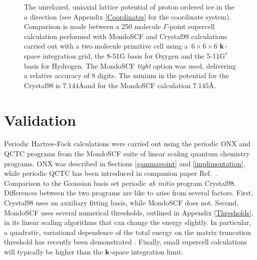 \documentclass[prb,aps,nobibnotes,twocolumn,doublespace,twocolumngrid,superbib]{revtex4}
\begin{document}
\begin{figure}[p]
\caption{The unrelaxed, uniaxial lattice potential of proton ordered ice \cite{}
in the $a$ direction (see Appendix \ref{Coordinates} for the coordinate system).  
Comparison is made between a 250 molecule $\Gamma$-point supercell calculation performed 
with {\sc MondoSCF} and {\sc Crystal98} calculations carried out with a two molecule primitive
cell using a~$6\times6\times6$ $\bf k$-space integration grid, the 8-51G basis for Oxygen and the 
5-11G$^*$ basis for Hydrogen.  The {\sc MondoSCF} {\it tight} option was used, delivering 
a relative accuracy of 8 digits. The minium in the potential for the {\sc Crystal98} is $7.144$\AA and  for
the {\sc MondoSCF} calculation  $7.145$\AA.}
\label{IceEnergyVsLattice}
\end{figure}


\section{Validation}

Periodic Hartree-Fock calculations were carried out using the periodic {\sc ONX} and {\sc QCTC}
programs from the {\sc MondoSCF} suite of linear scaling quantum chemistry programs.  {\sc ONX} was 
described in Sections \ref{gammapoint} and \ref{implimentation}, while periodic {\sc QCTC} has 
been introduced in companion paper Ref.~\cite{CTymczak04a}.   Comparison to the 
Gaussian basis set periodic {\em ab initio} program {\sc Crystal98}.  Differences between the
two programs are like to arise from several factors.  First, {\sc Crystal98} uses an auxiliary
fitting basis, while {\sc MondoSCF} does not.  Second, {\sc MondoSCF} uses several numerical 
thresholds, outlined in Appendix \ref{Thresholds}, in its linear scaling algorithms that can change 
the energy slightly.   In particular, a quadratic, variational dependence of the total energy
on the  matrix truncation threshold has recently been demonstrated \cite{ANiklasson03}.  Finally, 
small supercell calculations will typically be higher than the $\bf k$-space integration limit.
\end{document}
